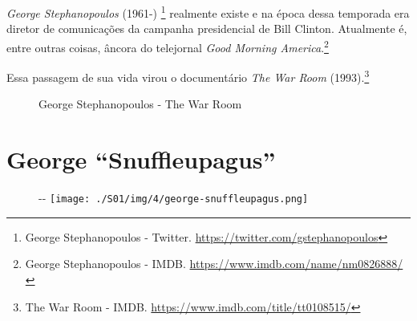 \saveparinfos
\noindent
\begin{minipage}[c]{0.5\textwidth}\useparinfo

\emph{George Stephanopoulos} (1961-) \footnote{\sloppy George Stephanopoulos - Twitter. \url{https://twitter.com/gstephanopoulos}}
realmente existe e na época dessa temporada era diretor de comunicações
da campanha presidencial de Bill Clinton. Atualmente é, entre outras
coisas, âncora do telejornal \emph{Good Morning America}.\footnote{\sloppy George Stephanopoulos - IMDB. \url{https://www.imdb.com/name/nm0826888/}}

Essa passagem de sua vida virou o documentário \emph{The War Room}
(1993).\footnote{\sloppy The War Room - IMDB. \url{https://www.imdb.com/title/tt0108515/}}

\end{minipage}\hfill
\begin{minipage}[c]{0.45\textwidth}

\begin{figure}
  \centering
    \caption{George Stephanopoulos - The War Room\label{fig:george-stephanopoulos-the-war-room}}
\end{figure}

\end{minipage}

\hypertarget{george-snuffleupagus}{%
\section{George ``Snuffleupagus''}\label{george-snuffleupagus}}

\begin{figure}[!ht]
  \begin{adjustwidth}{-\oddsidemargin-1in}{-\rightmargin}
    \centering
    \texttt{[image: ./S01/img/4/george-snuffleupagus.png]}
  \end{adjustwidth}
\end{figure}

